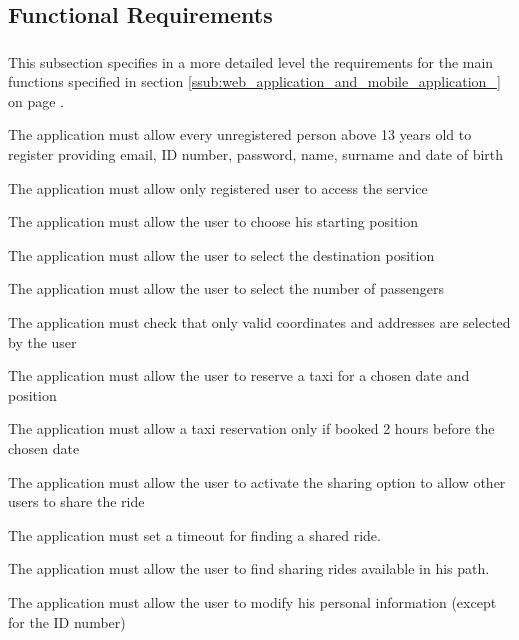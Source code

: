 
\subsection{Functional Requirements} %
\label{sec:functionalrequirement}
\subsubsection{}
This subsection specifies in a more detailed level the requirements for the main functions specified in section \ref{ssub:web_application_and_mobile_application_} on page \pageref{ssub:web_application_and_mobile_application_}.
\begin{enumerate}[label = \textbf{[FR\arabic*]}]
	\item The application must allow every unregistered person above 13 years old to register providing email, ID number, password, name, surname and date of birth
	\item The application must allow only registered user to access the service
	\item The application must allow the user to choose his starting position
	\item The application must allow the user to select the destination position
	\item The application must allow the user to select the number of passengers
	\item The application must check that only valid coordinates and addresses  are selected by the user
	\item The application must allow the user to reserve a taxi for a chosen  date and position
	\item The application must allow a taxi reservation only if booked 2 hours before the chosen date
	\item The application must allow the user to activate the sharing option to allow other users to share the ride
	\item The application must set a timeout for finding a shared ride.
	\item The application must allow the user to find sharing rides available in his path.
	\item The application must allow the user to modify his personal information (except for the ID number) 
\end{enumerate}


